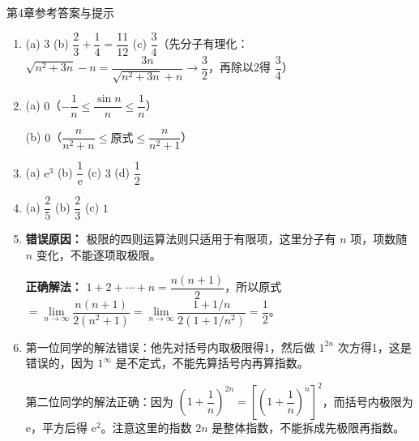 \documentclass[aspectratio=169,10pt,fontset=fandol]{ctexbeamer}
\newcommand{\ee}{\mathrm{e}}
\begin{document}
\begin{frame}[t,fragile]{第4章参考答案与提示}
\normalsize
{\normalsize
\begin{enumerate}

\item[1.] 

   (a) \(3\) \quad (b) \(\dfrac{2}{3} + \dfrac{1}{4} = \dfrac{11}{12}\) \quad (c) \(\dfrac{3}{4}\)（先分子有理化：\(\sqrt{n^2+3n} - n = \dfrac{3n}{\sqrt{n^2+3n}+n} \to \dfrac{3}{2}\)，再除以2得 \(\dfrac{3}{4}\)）



\item[2.] 

   (a) \(0\)（\(-\dfrac{1}{n} \leq \dfrac{\sin n}{n} \leq \dfrac{1}{n}\)）\quad 

   (b) \(0\)（\(\dfrac{n}{n^2+n} \leq \text{原式} \leq \dfrac{n}{n^2+1}\)）



\item[3.] 

(a) \(\ee^3\) \quad (b) \(\dfrac{1}{\ee}\) \quad (c) \(3\) \quad (d) \(\dfrac{1}{2}\)



\item[4.] 

   (a) \(\dfrac{2}{5}\) \quad (b) \(\dfrac{2}{3}\) \quad (c) \(1\)



\item[5.] 

   \textbf{错误原因：} 极限的四则运算法则只适用于有限项，这里分子有 \(n\) 项，项数随 \(n\) 变化，不能逐项取极限。

   

   \textbf{正确解法：} \(1+2+\cdots+n = \dfrac{n(n+1)}{2}\)，所以原式 \(= \lim\limits_{n\to\infty} \dfrac{n(n+1)}{2(n^2+1)} = \lim\limits_{n\to\infty} \dfrac{1+1/n}{2(1+1/n^2)} = \dfrac{1}{2}\)。



\item[6.] 

   第一位同学的解法错误：他先对括号内取极限得1，然后做 \(1^{2n}\) 次方得1，这是错误的，因为 \(1^\infty\) 是不定式，不能先算括号内再算指数。

   

第二位同学的解法正确：因为 \(\left(1+\dfrac{1}{n}\right)^{2n} = \left[\left(1+\dfrac{1}{n}\right)^n\right]^2\)，而括号内极限为 \(\ee\)，平方后得 \(\ee^2\)。注意这里的指数 \(2n\) 是整体指数，不能拆成先极限再指数。




\end{enumerate}}
\end{frame}
\end{document}
